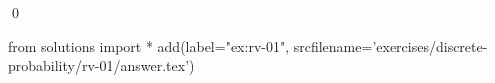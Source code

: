 
\begin{ex} 
  \label{ex:rv-01}
  
  \qed
\end{ex} 
\begin{python0}
from solutions import *
add(label="ex:rv-01",
    srcfilename='exercises/discrete-probability/rv-01/answer.tex') 
\end{python0}
